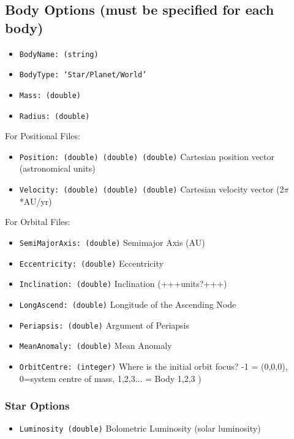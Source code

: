\documentclass[usenatbib,11pt]{article}
\begin{document}
\subsection{Body Options (must be specified for each body)}

\begin{itemize}
\item \texttt{BodyName: (string)}
\item \texttt{BodyType: `Star/Planet/World'}
\item{\texttt{Mass: (double)}}
\item{\texttt{Radius: (double)}}
\end{itemize}

For Positional Files:

\begin{itemize}

\item{\texttt{Position: (double) (double) (double)}} Cartesian position vector (astronomical units)
\item{\texttt{Velocity: (double) (double) (double)}} Cartesian velocity vector (2$\pi$ *AU/yr)
\end{itemize}


For Orbital Files:

\begin{itemize}
\item{\texttt{SemiMajorAxis: (double)}} Semimajor Axis (AU)
\item{\texttt{Eccentricity: (double)}} Eccentricity
\item{\texttt{Inclination: (double)}} Inclination (+++units?+++)
\item{\texttt{LongAscend: (double)}} Longitude of the Ascending Node
\item{\texttt{Periapsis: (double)}} Argument of Periapsis
\item{\texttt{MeanAnomaly: (double)}} Mean Anomaly
\item{\texttt{OrbitCentre: (integer)}} Where is the initial orbit focus? -1 = (0,0,0), 0=system centre of mass, 1,2,3... = Body 1,2,3 )
\end{itemize}

\subsubsection{Star Options}

\begin{itemize}
\item{\texttt{Luminosity (double)}} Bolometric Luminosity (solar luminosity)
\end{itemize}
\end{document}

